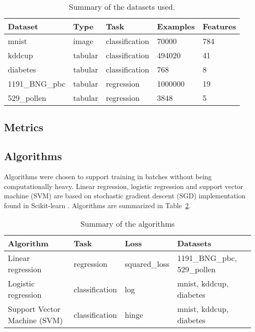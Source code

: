 \begin{table}[h]
    \centering
    \begin{tabular}{lllll}
        \toprule
        Dataset        & Type    & Task           & Examples & Features \\
        \midrule
        mnist          & image   & classification & 70000    & 784      \\
        kddcup         & tabular & classification & 494020   & 41       \\
        diabetes       & tabular & classification & 768      & 8        \\
        1191\_BNG\_pbc & tabular & regression     & 1000000  & 19       \\
        529\_pollen    & tabular & regression     & 3848     & 5        \\
        \bottomrule
    \end{tabular}
    \caption{Summary of the datasets used.}
    \label{table:datasets}
\end{table}



\subsection{Metrics}
\subsection{Algorithms}

Algorithms were chosen to support training in batches without being computationally heavy. Linear regression, logistic regression and support vector machine (SVM) are based on stochastic gradient descent (SGD) implementation found in Scikit-learn \parencite{pedregosaScikitlearnMachineLearning2011}. Algorithms are summarized in Table~\ref{table:algorithms}.

\begin{table}[h]
    \centering
    \begin{tabular}{llll}
        \toprule
        Algorithm                    & Task           & Loss          & Datasets                    \\
        \midrule
        Linear regression            & regression     & squared\_loss & 1191\_BNG\_pbc, 529\_pollen \\
        Logistic regression          & classification & log           & mnist, kddcup, diabetes     \\
        Support Vector Machine (SVM) & classification & hinge         & mnist, kddcup, diabetes     \\
        \bottomrule
    \end{tabular}
    \caption{Summary of the algorithms}
    \label{table:algorithms}
\end{table}



